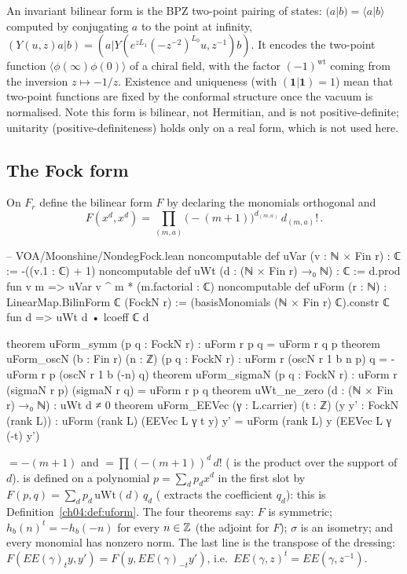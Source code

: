 \begin{physics}
An invariant bilinear form is the BPZ two-point pairing of states: $(a|b)=\langle a|b\rangle$ computed by conjugating $a$ to the point at infinity, $(Y(u,z)a|b)=(a|Y(e^{zL_1}(-z^{-2})^{L_0}u,z^{-1})b)$. It encodes the two-point function $\langle\phi(\infty)\phi(0)\rangle$ of a chiral field, with the factor $(-1)^{\mathrm{wt}}$ coming from the inversion $z\mapsto-1/z$. Existence and uniqueness (with $(\mathbf 1|\mathbf 1)=1$) mean that two-point functions are fixed by the conformal structure once the vacuum is normalised. Note this form is bilinear, not Hermitian, and is not positive-definite; unitarity (positive-definiteness) holds only on a real form, which is not used here.
\end{physics}

\subsection{The Fock form}

\begin{definition}\label{ch04:def:uform}
On $F_r$ define the bilinear form $F$ by declaring the monomials orthogonal and
\begin{equation*}
  F(x^d,x^d)=\prod_{(m,a)}\big(-(m+1)\big)^{d_{(m,a)}}\,d_{(m,a)}!\,.
\end{equation*}
\end{definition}

\begin{leancode}
-- VOA/Moonshine/NondegFock.lean
noncomputable def uVar (v : ℕ × Fin r) : ℂ := -((v.1 : ℂ) + 1)
noncomputable def uWt (d : (ℕ × Fin r) →₀ ℕ) : ℂ :=
  d.prod fun v m => uVar v ^ m * (m.factorial : ℂ)
noncomputable def uForm (r : ℕ) : LinearMap.BilinForm ℂ (FockN r) :=
  (basisMonomials (ℕ × Fin r) ℂ).constr ℂ fun d => uWt d • lcoeff ℂ d

theorem uForm_symm (p q : FockN r) : uForm r p q = uForm r q p
theorem uForm_oscN (b : Fin r) (n : ℤ) (p q : FockN r) :
    uForm r (oscN r 1 b n p) q = -uForm r p (oscN r 1 b (-n) q)
theorem uForm_sigmaN (p q : FockN r) : uForm r (sigmaN r p) (sigmaN r q) = uForm r p q
theorem uWt_ne_zero (d : (ℕ × Fin r) →₀ ℕ) : uWt d ≠ 0
theorem uForm_EEVec (γ : L.carrier) (t : ℤ) (y y' : FockN (rank L)) :
    uForm (rank L) (EEVec L γ t y) y' = uForm (rank L) y (EEVec L γ (-t) y')
\end{leancode}

\begin{dictionary}
 $=-(m+1)$ and  $=\prod(-(m+1))^{d}\,d!$ ( is the product
over the support of $d$).  is defined on a polynomial $p=\sum_dp_dx^d$ in the first slot
by $F(p,q)=\sum_dp_d\,\mathrm{uWt}(d)\,q_d$ ( extracts the coefficient $q_d$): this is
Definition~\ref{ch04:def:uform}. The four theorems say: $F$ is symmetric; $h_b(n)^t=-h_b(-n)$ for
every $n\in{\mathbb{Z}}$ (the adjoint for $F$); $\sigma$ is an isometry; and every monomial has nonzero norm.
The last line is the transpose of the dressing: $F(EE(\gamma)_ty,y')=F(y,EE(\gamma)_{-t}y')$, i.e.\
$EE(\gamma,z)^t=EE(\gamma,z^{-1})$.
\end{dictionary}

